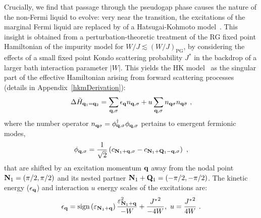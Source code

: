 \documentclass[%
 reprint,
superscriptaddress,
groupedaddress,
 amsmath,amssymb,
 aps,
prl
]{revtex4-2}
\begin{document}
Crucially, we find that passage through the pseudogap phase causes the nature of the non-Fermi liquid to evolve: very near the transition, the excitations of the marginal Fermi liquid %
are replaced by 
of a Hatsugai-Kohmoto model~\cite{Baskaran1991,Hatsugai1992}. %
This insight is obtained from a perturbation-theoretic treatment of the RG fixed point Hamiltonian of the impurity model for $W/J\lesssim (W/J)_{\text{PG}}$,
by considering the effects of a small fixed point Kondo scattering probability \(J^*\) in the backdrop of a larger bath interaction parameter \(|W|\). 
This yields the HK model~\cite{Baskaran1991,Hatsugai1992} as the singular
part of the effective Hamiltonian arising from forward scattering processes 
(details 
in Appendix~\ref{hkmDerivation}):
\begin{equation}\begin{aligned}\label{HKModel}
	\Delta \tilde H_{{\bf q}_1 = {\bf q}_2} = \sum_{{\bf q},\sigma}\epsilon_{{\bf q}}{n}_{{\bf q},\sigma} + u\sum_{{\bf q}, \sigma}n_{{\bf q} \sigma} n_{{\bf q} \bar\sigma}~,
\end{aligned}\end{equation}
where the number operator \(n_{{\bf q} \sigma} = \phi^\dagger_{{\bf q}, \sigma} \phi_{{\bf q}, \sigma}\) pertains to emergent fermionic modes,
\begin{equation}\begin{aligned}
	\phi_{{\bf q}, \sigma} = \frac{1}{\sqrt 2}\left(c_{{\bf N}_1 + {\bf q},\sigma} - c_{{\bf N}_1 + {\bf Q}_1 - {\bf q}, \sigma}\right)~,
\end{aligned}\end{equation}
that are shifted by an excitation momentum \({\bf q}\) away from the nodal point \({\bf N}_1 = \left(\pi/2, \pi/2\right)\) and its nested partner \({\bf N}_1 + {\bf Q}_1 = \left(-\pi/2, -\pi/2\right)\). The kinetic energy (\(\epsilon_{\bf q}\)) and interaction \(u\) energy scales of the excitations are:
\begin{equation}\begin{aligned}
	\epsilon_{\bf q} = \text{sign}\left(\varepsilon_{{\bf N}_1 + {\bf q}}\right)\frac{\varepsilon_{{\bf N}_1 + {\bf q}}^2}{-W} + \frac{{J^*}^2}{-4W},~u = \frac{{J^*}^2}{4W}~.
\end{aligned}\end{equation}
\end{document}

